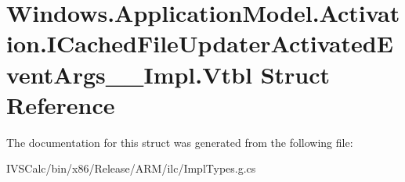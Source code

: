 \hypertarget{struct_windows_1_1_application_model_1_1_activation_1_1_i_cached_file_updater_activated_event_args_____impl_1_1_vtbl}{}\section{Windows.\+Application\+Model.\+Activation.\+I\+Cached\+File\+Updater\+Activated\+Event\+Args\+\_\+\+\_\+\+Impl.\+Vtbl Struct Reference}
\label{struct_windows_1_1_application_model_1_1_activation_1_1_i_cached_file_updater_activated_event_args_____impl_1_1_vtbl}


The documentation for this struct was generated from the following file\+:\begin{DoxyCompactItemize}
\item 
I\+V\+S\+Calc/bin/x86/\+Release/\+A\+R\+M/ilc/Impl\+Types.\+g.\+cs\end{DoxyCompactItemize}
